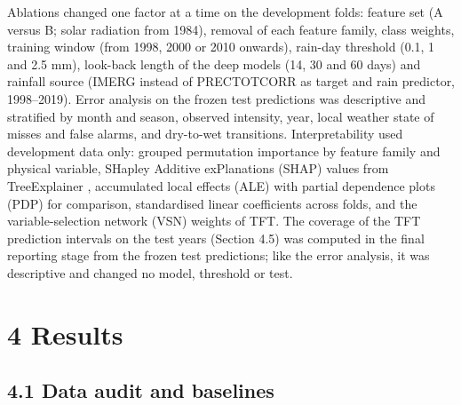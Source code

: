 \documentclass[
]{article}
\begin{document}
Ablations changed one factor at a time on the development folds: feature set (A versus B; solar radiation from 1984), removal of each feature family, class weights, training window (from 1998, 2000 or 2010 onwards), rain-day threshold (0.1, 1 and 2.5 mm), look-back length of the deep models (14, 30 and 60 days) and rainfall source (IMERG instead of PRECTOTCORR as target and rain predictor, 1998--2019). Error analysis on the frozen test predictions was descriptive and stratified by month and season, observed intensity, year, local weather state of misses and false alarms, and dry-to-wet transitions. Interpretability used development data only: grouped permutation importance by feature family and physical variable, SHapley Additive exPlanations (SHAP) values from TreeExplainer \citep{lundberg2017}, accumulated local effects (ALE) \citep{apley2020} with partial dependence plots (PDP) for comparison, standardised linear coefficients across folds, and the variable-selection network (VSN) weights of TFT. The coverage of the TFT prediction intervals on the test years (Section 4.5) was computed in the final reporting stage from the frozen test predictions; like the error analysis, it was descriptive and changed no model, threshold or test.

\hypertarget{results}{%
\section{4 Results}\label{results}}

\hypertarget{data-audit-and-baselines}{%
\subsection{4.1 Data audit and baselines}\label{data-audit-and-baselines}}
\end{document}

